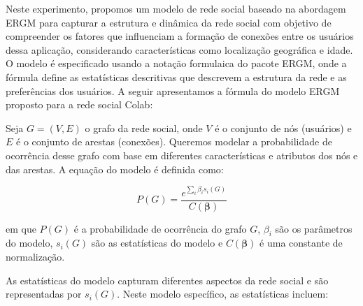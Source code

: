 Neste experimento, propomos um modelo de rede social baseado na abordagem ERGM para capturar a estrutura e dinâmica da rede social com objetivo de compreender os fatores que influenciam a formação de conexões entre os usuários dessa aplicação, considerando características como localização geográfica e idade. O modelo é especificado usando a notação formulaica do pacote ERGM, onde a fórmula define as estatísticas descritivas que descrevem a estrutura da rede e as preferências dos usuários. A seguir apresentamos a fórmula do modelo ERGM proposto para a rede social Colab:

Seja $G = (V, E)$ o grafo da rede social, onde $V$ é o conjunto de nós (usuários) e $E$ é o conjunto de arestas (conexões). Queremos modelar a probabilidade de ocorrência desse grafo com base em diferentes características e atributos dos nós e das arestas. A equação do modelo é definida como:

\[
	P(G) = \frac{e^{\sum_i \beta_i s_i(G)}}{C(\boldsymbol{\beta})}
\]

em que $P(G)$ é a probabilidade de ocorrência do grafo $G$, $\beta_i$ são os parâmetros do modelo, $s_i(G)$ são as estatísticas do modelo e $C(\boldsymbol{\beta})$ é uma constante de normalização.

As estatísticas do modelo capturam diferentes aspectos da rede social e são representadas por $s_i(G)$. Neste modelo específico, as estatísticas incluem:

